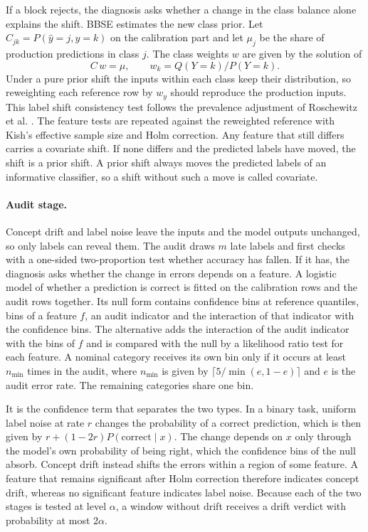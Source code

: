 \documentclass[10pt]{article}
\begin{document}
If a block rejects, the diagnosis asks whether a change in the class balance alone explains the shift. BBSE estimates the new class prior. Let $C_{jk}=P(\hat y=j,y=k)$ on the calibration part and let $\mu_j$ be the share of production predictions in class $j$. The class weights $w$ are given by the solution of
\begin{equation}
C\,w = \mu, \qquad w_k = Q(Y=k)/P(Y=k).
\label{eq:bbse}
\end{equation}
Under a pure prior shift the inputs within each class keep their distribution, so reweighting each reference row by $w_{y}$ should reproduce the production inputs. This label shift consistency test follows the prevalence adjustment of Roschewitz et al. \cite{roschewitz2025shiftid}. The feature tests are repeated against the reweighted reference with Kish's effective sample size \cite{kish1965} and Holm correction. Any feature that still differs carries a covariate shift. If none differs and the predicted labels have moved, the shift is a prior shift. A prior shift always moves the predicted labels of an informative classifier, so a shift without such a move is called covariate.

\paragraph{Audit stage.} Concept drift and label noise leave the inputs and the model outputs unchanged, so only labels can reveal them. The audit draws $m$ late labels and first checks with a one-sided two-proportion test whether accuracy has fallen. If it has, the diagnosis asks whether the change in errors depends on a feature. A logistic model of whether a prediction is correct is fitted on the calibration rows and the audit rows together. Its null form contains  confidence bins at reference quantiles, bins of a feature $f$, an audit indicator and the interaction of that indicator with the confidence bins. The alternative adds the interaction of the audit indicator with the bins of $f$ and is compared with the null by a likelihood ratio test for each feature. A nominal category receives its own bin only if it occurs at least $n_{\min}$ times in the audit, where $n_{\min}$ is given by $\lceil 5/\min(e,1-e)\rceil$ and $e$ is the audit error rate. The remaining categories share one bin.

It is the confidence term that separates the two types. In a binary task, uniform label noise at rate $r$ changes the probability of a correct prediction, which is then given by $r+(1-2r)P(\mathrm{correct}\mid x)$. The change depends on $x$ only through the model's own probability of being right, which the confidence bins of the null absorb. Concept drift instead shifts the errors within a region of some feature. A feature that remains significant after Holm correction therefore indicates concept drift, whereas no significant feature indicates label noise. Because each of the two stages is tested at level $\alpha$, a window without drift receives a drift verdict with probability at most $2\alpha$.
\end{document}
